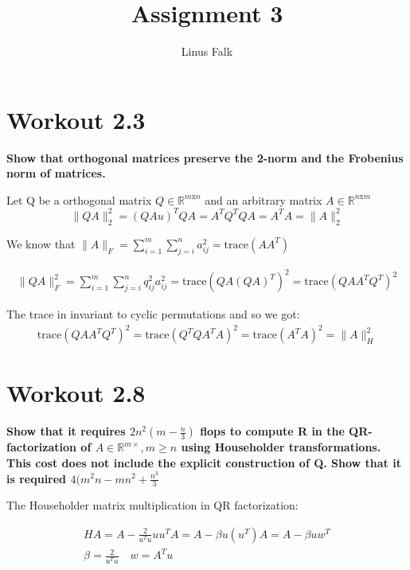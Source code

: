 \documentclass[a4paper]{article}
\title{Assignment 3}
\author{Linus Falk}
\begin{document}
\maketitle

\section{Workout 2.3}
\textbf{Show that orthogonal matrices preserve the 2-norm and the Frobenius norm
of matrices.}

Let Q be a orthogonal matrix $Q \in \mathbb{R}^{m\text{x}n}$ and an arbitrary matrix $A \in \mathbb{R}^{n \text{x}m}$
\begin{equation}
\|QA\|^2_2 = (QAu)^{T}QA = A^{T}Q^{T}QA = A^{T}A = \|A\|^{2}_2
\end{equation}

We know that $ \|A\|_F =  \sum_{i=1}^{m} \sum_{j=i}^{n} a^2_{ij} = \text{trace}(AA^{T}) $

\begin{equation}
	\begin{aligned}
		\|QA\|^{2}_F = \sum_{i=1}^{m} \sum_{j=i}^{n} q^2_{ij}a^2_{ij} =  \text{trace}(QA(QA)^{T})^2 = \text{trace}(QAA^{T}Q^{T})^2
	\end{aligned}
\end{equation}

The trace in invariant to cyclic permutations and so we got: 
\begin{equation}
	\begin{aligned}
		\text{trace}(QA A^{T}Q^{T})^2 = \text{trace}(Q^{T}QA^{T}A)^2 = \text{trace}(A^{T}A )^2 = \|A\|^2_H
	\end{aligned}
\end{equation}


\section{Workout 2.8}
\textbf{Show that it requires $2n^2(m-\frac{n}{3})$ flops to compute R in the QR-factorization of $A\in \mathbb{R}^{m\times}, m \ge n$ using Householder transformations. This cost does not include the explicit construction of Q. Show that it is required $4(m^2n-mn^2 + \frac{n^{3}}{3}$ }

The Householder matrix multiplication in QR factorization:

\begin{equation}
	\begin{aligned}
	HA= A -  \frac{2}{u^{T}u} uu^{T}A = A - \beta u(u^{T})A = A - \beta u w^{T} \\
	\beta = \frac{2}{u^{T}u} \quad w = A^{T}u
	\end{aligned} 
\end{equation}
\end{document}
